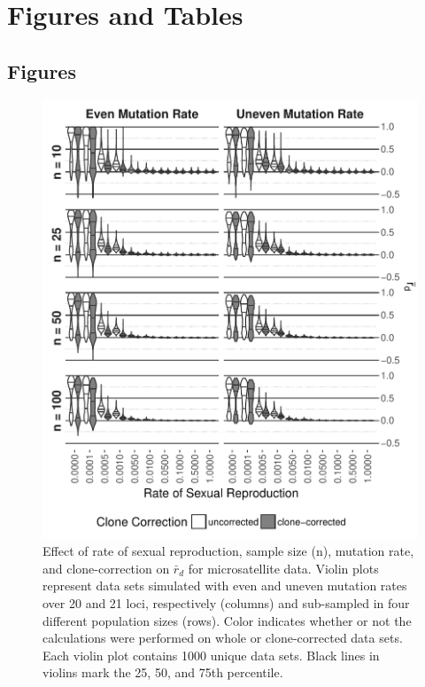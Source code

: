 \documentclass[]{article}
\theoremstyle{definition}
\theoremstyle{definition}
\theoremstyle{remark}
\begin{document}
\section{Figures and Tables}\label{figures-and-tables}

\subsection{Figures}\label{figures}

\begin{figure}
\centering
\includegraphics[width=1.00000\textwidth]{figure/rd_sexrate.pdf}
\caption{Effect of rate of sexual reproduction, sample size (n),
mutation rate, and clone-correction on \(\bar{r}_d\) for microsatellite
data. Violin plots represent data sets simulated with even and uneven
mutation rates over 20 and 21 loci, respectively (columns) and
sub-sampled in four different population sizes (rows). Color indicates
whether or not the calculations were performed on whole or
clone-corrected data sets. Each violin plot contains 1000 unique data
sets. Black lines in violins mark the 25, 50, and 75th
percentile.}\label{fig:sim1}
\end{figure}
\end{document}
